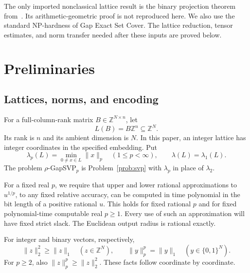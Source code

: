 \documentclass[11pt,letterpaper]{article}
\numberwithin{equation}{section}
\theoremstyle{definition}
\theoremstyle{remark}
\newcommand{\Z}{\mathbb Z}
\begin{document}
The only imported nonclassical lattice result is the binary projection theorem from~\cite[Theorem 7.3 and its preceding proof]{wan}. Its arithmetic-geometric proof is not reproduced here. We also use the standard NP-hardness of Gap Exact Set Cover. The lattice reduction, tensor estimates, and norm transfer needed after these inputs are proved below.

\section{Preliminaries}\label{sec:prelim}
\subsection{Lattices, norms, and encoding}
For a full-column-rank matrix $B\in\Z^{N\times n}$, let
\[
 L(B)=B\Z^n\subseteq\Z^N.
\]
Its rank is $n$ and its ambient dimension is $N$. In this paper, an integer lattice has integer coordinates in the specified embedding. Put
\[
 \lambda_p(L)=\min_{0\ne x\in L}\|x\|_p\quad(1\le p<\infty),
 \qquad \lambda(L)=\lambda_1(L).
\]
The problem $\rho$-GapSVP$_p$ is Problem~\ref{prob:svp} with $\lambda_p$ in place of $\lambda_2$.

For a fixed real $p$, we require that upper and lower rational approximations to $u^{1/p}$, to any fixed relative accuracy, can be computed in time polynomial in the bit length of a positive rational $u$. This holds for fixed rational $p$ and for fixed polynomial-time computable real $p\ge1$. Every use of such an approximation will have fixed strict slack. The Euclidean output radius is rational exactly.

For integer and binary vectors, respectively,
\begin{equation}\label{eq:integer-norms}
 \|z\|_2^2\ge\|z\|_1\quad(z\in\Z^N),
 \qquad \|y\|_p^p=\|y\|_1\quad(y\in\{0,1\}^N).
\end{equation}
For $p\ge2$, also $\|z\|_p^p\ge\|z\|_2^2$. These facts follow coordinate by coordinate.
\end{document}
